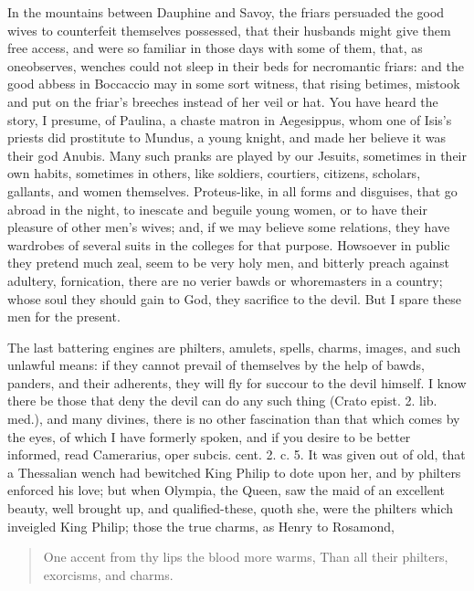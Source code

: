 In the mountains between Dauphine and Savoy, the friars persuaded
the good wives to counterfeit themselves possessed, that their husbands
might give them free access, and were so familiar in those days with
some of them, that, as oneobserves, wenches could not sleep in
their beds for necromantic friars: and the good abbess in Boccaccio may
in some sort witness, that rising betimes, mistook and put on the
friar's breeches instead of her veil or hat. You have heard the story,
I presume, of  Paulina, a chaste matron in Aegesippus, whom one
of Isis's priests did prostitute to Mundus, a young knight, and made
her believe it was their god Anubis. Many such pranks are played by our
Jesuits, sometimes in their own habits, sometimes in others, like
soldiers, courtiers, citizens, scholars, gallants, and women
themselves. Proteus-like, in all forms and disguises, that go abroad in
the night, to inescate and beguile young women, or to have their
pleasure of other men's wives; and, if we may believe  some
relations, they have wardrobes of several suits in the colleges for
that purpose. Howsoever in public they pretend much zeal, seem to be
very holy men, and bitterly preach against adultery, fornication, there
are no verier bawds or whoremasters in a country; whose soul they
should gain to God, they sacrifice to the devil. But I spare these men
for the present.

The last battering engines are philters, amulets, spells, charms,
images, and such unlawful means: if they cannot prevail of themselves
by the help of bawds, panders, and their adherents, they will fly for
succour to the devil himself. I know there be those that deny the devil
can do any such thing (Crato epist. 2. lib. med.), and many divines,
there is no other fascination than that which comes by the eyes, of
which I have formerly spoken, and if you desire to be better informed,
read Camerarius, oper subcis. cent. 2. c. 5. It was given out of old,
that a Thessalian wench had bewitched King Philip to dote upon her, and
by philters enforced his love; but when Olympia, the Queen, saw the
maid of an excellent beauty, well brought up, and qualified-these,
quoth she, were the philters which inveigled King Philip; those the
true charms, as Henry to Rosamond,

\begin{verse}%
One accent from thy lips the blood more warms,
Than all their philters, exorcisms, and charms.
\end{verse}%

